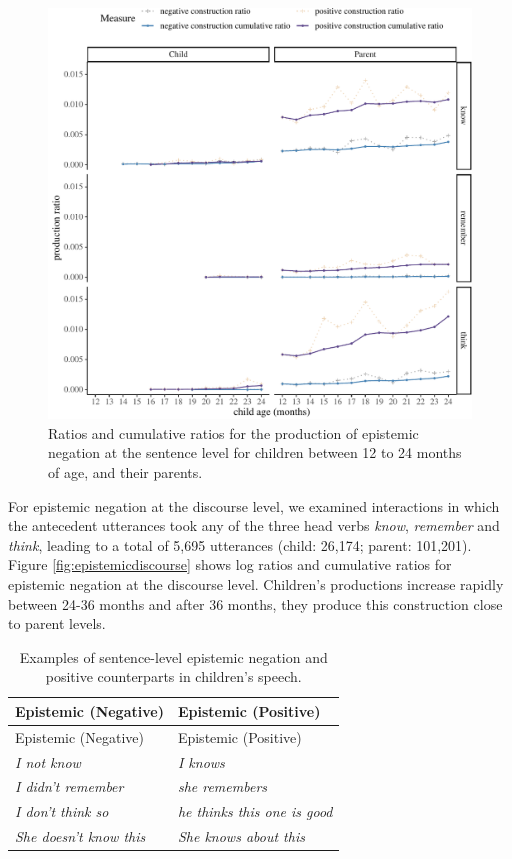 \documentclass[
  english,
  man,floatsintext]{apa6}
\begin{document}
\begin{figure}[H]

{\centering \includegraphics{neg_construction_article_files/figure-latex/epistemicbegin-1} 

}

\caption{Ratios and cumulative ratios for the production of epistemic negation at the sentence level for children between 12 to 24 months of age, and their parents.}\label{fig:epistemicbegin}
\end{figure}

For epistemic negation at the discourse level, we examined interactions in which the antecedent utterances took any of the three head verbs \emph{know}, \emph{remember} and \emph{think}, leading to a total of 5,695 utterances (child: 26,174; parent: 101,201). Figure \ref{fig:epistemicdiscourse} shows log ratios and cumulative ratios for epistemic negation at the discourse level. Children's productions increase rapidly between 24-36 months and after 36 months, they produce this construction close to parent levels.

\begin{longtable}[]{@{}ll@{}}
\caption{\label{tab:epistem} Examples of sentence-level epistemic negation and positive counterparts in children's speech.}\tabularnewline
\toprule
Epistemic (Negative) & Epistemic (Positive) \\
\midrule
\endfirsthead
\toprule
Epistemic (Negative) & Epistemic (Positive) \\
\midrule
\endhead
\emph{I not know} & \emph{I knows} \\
\emph{I didn't remember} & \emph{she remembers} \\
\emph{I don't think so} & \emph{he thinks this one is good} \\
\emph{She doesn't know this} & \emph{She knows about this} \\
\bottomrule
\end{longtable}
\end{document}
